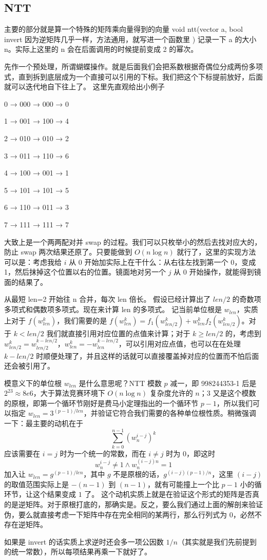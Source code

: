 \subsection{NTT}

主要的部分就是算一个特殊的矩阵乘向量得到的向量
void ntt(vector a, bool invert 因为逆矩阵几乎一样，方法通用，就写进一个函数里 )
记录一下 a 的大小 n。实际上这里的 n 会在后面调用的时候提前变成 2 的幂次。

先作一个预处理，所谓蝴蝶操作。就是后面我们会把系数根据奇偶位分成两份多项式，直到拆到底层成为一个直接可以引用的下标。我们把这个下标提前放好，后面就可以迭代地自下往上了。
这里先直观给出小例子

0 → 000 → 000 → 0  

1 → 001 → 100 → 4  

2 → 010 → 010 → 2  

3 → 011 → 110 → 6  

4 → 100 → 001 → 1  

5 → 101 → 101 → 5  

6 → 110 → 011 → 3  

7 → 111 → 111 → 7

大致上是一个两两配对并 swap 的过程。我们可以只枚举小的然后去找对应大的，防止 swap 两次结果还原了。只要能做到 $O(n\log n)$ 就行了，这里的实现方法可以是：考虑我给 $i$ 从 $0$ 开始加实际上在干什么：从右往左找到第一个 0，变成 1，然后抹掉这个位置以右的位置。镜面地对另一个 $j$ 从 $0$ 开始操作，就能得到镜面的结果了。

从最短 len=2 开始往 n 合并，每次 len 倍长。
假设已经计算出了 $len/2$ 的奇数项多项式和偶数项多项式。现在来计算 len 的多项式。
记当前单位根是 $w_{len}$，实质上对于 $f(w_{len}^{k})$，我们需要的是 $f(w_{len}^{k}) = f_1(w_{len/2}^{k}) +w_{len}^{k}f_2(w_{len/2}^{k})$。对于 $k<len/2$ 我们就直接引用对应位置的点值来计算；对于 $k\ge len/2$ 的，考虑到 $w_{len/2}^{k} = w_{len/2}^{k-len/2}$，$w_{len}^{k} = -w_{len}^{k-len/2}$，可以引用对应点值，也可以在在处理 $k-len/2$ 时顺便处理了，并且这样的话就可以直接覆盖掉对应的位置而不怕后面还会被引用了。

模意义下的单位根 $w_{len}$ 是什么意思呢？NTT 模数 $p$ 减一，即 998244353-1 后是 $2^{23}\approx 8e6$，大于算法竞赛环境下 $O(n\log n)$ 复杂度允许的 $n$；$3$ 又是这个模数的原根，即第一个循环节刚好是费马小定理指出的一个循环节 $p-1$，所以我们可以指定 $w_{len} = 3^{(p-1)/len}$，并验证它符合我们需要的各种单位根性质。稍微强调一下：最主要的动机在于
$$
\sum_{k=0}^{n-1}(w_n^{i-j})^{k}
$$
应该需要在 $i=j$ 时为一个统一的常数，而在 $i\not=j$ 时为 $0$，即这时
$$
w_{n}^{i-j}\not= 1 \land w_{n}^{(i-j)n}=1
$$
加入让 $w_{len}=g^{(p-1)/len}$，其中 $g$ 不是原根的话，$g^{(i-j)(p-1)/n}$，这里 $(i-j)$ 的取值范围实际上是 $-(n-1)$ 到 $(n-1)$，就有可能撞上一个比 $p-1$ 小的循环节，让这个结果变成 $1$ 了。
这个动机实质上就是在验证这个形式的矩阵是否真的是逆矩阵。对于原根打底的，那确实是。反之，要么我们通过上面的解剖来验证伪，要么就直接考虑一下矩阵中存在完全相同的某两行，那么行列式为 $0$，必然不存在逆矩阵。


如果是 invert 的话实质上求逆时还会多一项公因数 $1/n$（其实就是我们先前提到的统一常数），所以每项结果再乘一下就好了。

